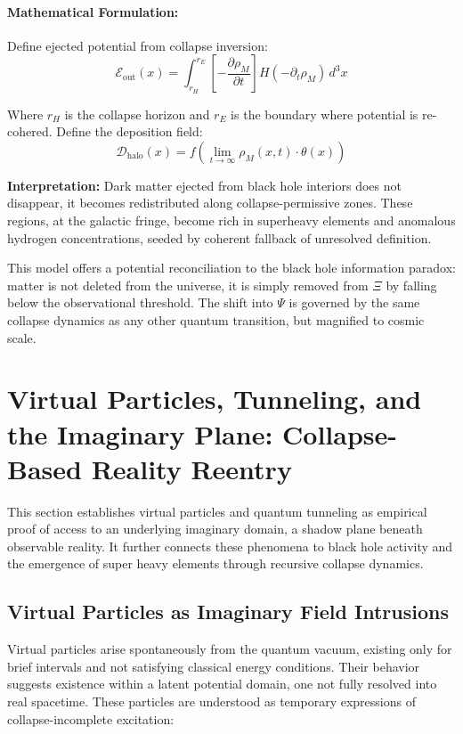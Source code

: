 \paragraph{Mathematical Formulation:}
Define ejected potential from collapse inversion:
\begin{equation}
\mathcal{E}_{\text{out}}(x) = \int_{r_H}^{r_E} \left[ -\frac{\partial \rho_M}{\partial t} \right] H(-\partial_t \rho_M) \, d^3x
\end{equation}

Where $r_H$ is the collapse horizon and $r_E$ is the boundary where potential is re-cohered. Define the deposition field:
\begin{equation}
\mathcal{D}_{\text{halo}}(x) = f\left( \lim_{t \to \infty} \rho_M(x,t) \cdot \theta(x) \right)
\end{equation}

\textbf{Interpretation:} Dark matter ejected from black hole interiors does not disappear, it becomes redistributed along collapse-permissive zones. These regions, at the galactic fringe, become rich in superheavy elements and anomalous hydrogen concentrations, seeded by coherent fallback of unresolved definition.


This model offers a potential reconciliation to the black hole information paradox: matter is not deleted from the universe, it is simply removed from \( \Xi \) by falling below the observational threshold. The shift into \( \Psi \) is governed by the same collapse dynamics as any other quantum transition, but magnified to cosmic scale.

\section{Virtual Particles, Tunneling, and the Imaginary Plane: Collapse-Based Reality Reentry}

This section establishes virtual particles and quantum tunneling as empirical proof of access to an underlying imaginary domain, a shadow plane beneath observable reality. It further connects these phenomena to black hole activity and the emergence of super heavy elements through recursive collapse dynamics.

\subsection{Virtual Particles as Imaginary Field Intrusions}
Virtual particles arise spontaneously from the quantum vacuum, existing only for brief intervals and not satisfying classical energy conditions. Their behavior suggests existence within a latent potential domain, one not fully resolved into real spacetime. These particles are understood as temporary expressions of collapse-incomplete excitation:

